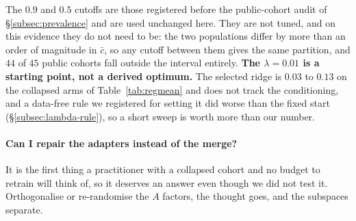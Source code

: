 \begin{center}
\end{center}

The $0.9$ and $0.5$ cutoffs are those registered before the public-cohort
audit of \S\ref{subsec:prevalence} and are used unchanged here. They are not
tuned, and on this evidence they do not need to be: the two populations differ
by more than an order of magnitude in $\bar c$, so any cutoff between them
gives the same partition, and $44$ of $45$ public cohorts fall outside the
interval entirely. \textbf{The $\lambda = 0.01$ is a starting point, not a
derived optimum.} The selected ridge is $0.03$ to $0.13$ on the collapsed arms
of Table~\ref{tab:regmean} and does not track the conditioning, and a
data-free rule we registered for setting it did worse than the fixed start
(\S\ref{subsec:lambda-rule}), so a short sweep is worth more than our number.

\paragraph{Can I repair the adapters instead of the merge?} It is the first
thing a practitioner with a collapsed cohort and no budget to retrain will
think of, so it deserves an answer even though we did not test it. Orthogonalise
or re-randomise the $A$ factors, the thought goes, and the subspaces separate.

